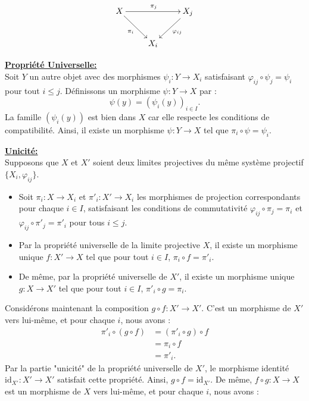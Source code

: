 \documentclass[a4paper, 14pt]{report}
\begin{document}
\begin{onehalfspace}
{\[
\xymatrix{
	X \ar[rr]^{\pi_{j}} \ar[dr]_{\pi_i} & & X_{j} \ar[dl]^{\varphi_{ij}} \\
	& X_{i} &
}
\]


\textbf{\underline{Propriété Universelle:}}\\
Soit \(Y\) un autre objet avec des morphismes \(\psi_i : Y \to X_i\) satisfaisant \(\varphi_{ij} \circ \psi_j = \psi_i\) pour tout \(i \leq j\). Définissons un morphisme \(\psi : Y \to X\) par :
\[
\psi(y) = (\psi_i(y))_{i \in I}.
\]
La famille \((\psi_i(y))\) est bien dans \(X\) car elle respecte les conditions de compatibilité. Ainsi, il existe un morphisme \(\psi : Y \to X\) tel que \(\pi_i \circ \psi = \psi_i\).

\textbf{\underline{Unicité:}}\\
Supposons que \(X\) et \(X'\) soient deux limites projectives du même système projectif \(\{X_i, \varphi_{ij}\}\).

\begin{itemize}
	\item Soit \(\pi_i : X \to X_i\) et \(\pi'_i : X' \to X_i\) les morphismes de projection correspondants pour chaque \(i \in I\), satisfaisant les conditions de commutativité \(\varphi_{ij} \circ \pi_j = \pi_i\) et \(\varphi_{ij} \circ \pi'_j = \pi'_i\) pour tous \(i \leq j\).
	\item Par la propriété universelle de la limite projective \(X\), il existe un morphisme unique \(f : X' \to X\) tel que pour tout \(i \in I\), \(\pi_i \circ f = \pi'_i\).
	\item De même, par la propriété universelle de \(X'\), il existe un morphisme unique \(g : X \to X'\) tel que pour tout \(i \in I\), \(\pi'_i \circ g = \pi_i\).
\end{itemize}

Considérons maintenant la composition \(g \circ f : X' \to X'\). C'est un morphisme de \(X'\) vers lui-même, et pour chaque \(i\), nous avons :
\[
\begin{aligned}
	\pi'_i \circ (g \circ f) &= (\pi'_i \circ g) \circ f \\
	&= \pi_i \circ f \\
	&= \pi'_i.
\end{aligned}
\]
Par la partie "unicité" de la propriété universelle de \(X'\), le morphisme identité \(\text{id}_{X'} : X' \to X'\) satisfait cette propriété. Ainsi, \(g \circ f = \text{id}_{X'}\).
De même, \(f \circ g : X \to X\) est un morphisme de \(X\) vers lui-même, et pour chaque \(i\), nous avons :

}
\end{onehalfspace}
\end{document}
